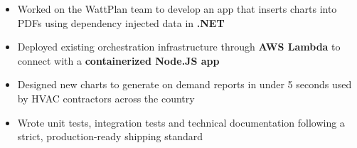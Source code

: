 \begin{itemize}
    \item Worked on the WattPlan team to develop an app that inserts charts into PDFs using dependency injected data in \textbf{.NET}
    \item Deployed existing orchestration infrastructure through \textbf{AWS Lambda} to connect with a \textbf{containerized Node.JS app}
    \item Designed new charts to generate on demand reports in under 5 seconds used by HVAC contractors across the country
    \item Wrote unit tests, integration tests and technical documentation following a strict, production-ready shipping standard
\end{itemize}

